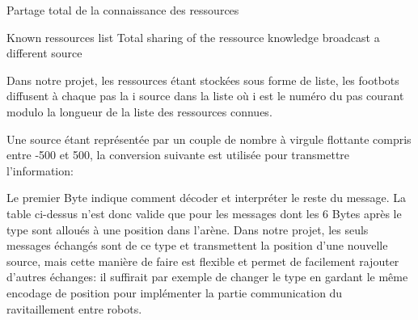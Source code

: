 \begin{algorithm}
  \caption{Partage total de la connaissance des ressources}
  \begin{algorithmic}
  \REQUIRE Known ressources list
  \ENSURE Total sharing of the ressource knowledge
  \LOOP
  \STATE broadcast a different source
  \ENDLOOP
  \end{algorithmic}
\end{algorithm}

Dans notre projet, les ressources étant stockées sous forme de liste, les footbots diffusent à chaque pas la i\ieme{} source dans la liste où i est le numéro du pas courant modulo la longueur de la liste des ressources connues.

Une source étant représentée par un couple de nombre à virgule flottante compris entre -500 et 500, la conversion suivante est utilisée pour transmettre l'information:

\vspace{1em}

\vspace{1em}

Le premier Byte indique comment décoder et interpréter le reste du message. La table ci-dessus n'est donc valide que pour les messages dont les 6 Bytes après le type sont alloués à une position dans l'arène. Dans notre projet, les seuls messages échangés sont de ce type et transmettent la position d'une nouvelle source, mais cette manière de faire est flexible et permet de facilement rajouter d'autres échanges: il suffirait par exemple de changer le type en gardant le même encodage de position pour implémenter la partie communication du ravitaillement entre robots.

